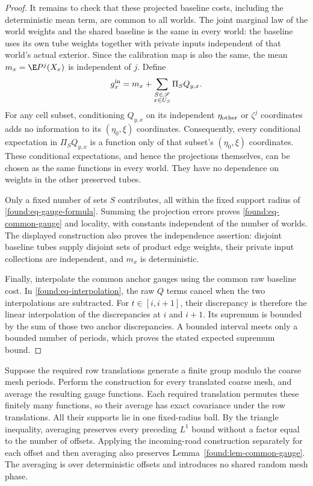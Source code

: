 \begin{proof}
It remains to check that these projected baseline costs, including
the deterministic mean term, are common to all worlds.  The joint
marginal law of the world weights and the shared baseline is the same
in every world: the baseline uses its own tube weights together with
private inputs independent of that world's actual exterior.  Since
the calibration map is also the same, the mean
$m_x=\E P^j(X_x)$ is independent of $j$.  Define
\[
 g_x^{\rm in}=m_x+
       \sum_{\substack{S\in\mathscr S\\x\in U_S}}
                        \Pi_SQ_{y,x}.
\]
For any cell subset, conditioning $Q_{y,x}$ on its independent
$\eta_{\rm other}$ or $\zeta^j$ coordinates adds no information to
its $(\eta_0,\xi)$ coordinates.  Consequently, every conditional
expectation in $\Pi_SQ_{y,x}$ is a function only of that subset's
$(\eta_0,\xi)$ coordinates.  These conditional expectations, and
hence the projections themselves, can be chosen as the same
functions in every world.  They have no dependence on weights in
the other preserved tubes.

Only a fixed number of sets $S$ contributes, all within the fixed
support radius of \eqref{found:eq-gauge-formula}.  Summing the
projection errors proves \eqref{found:eq-common-gauge} and locality,
with constants independent of the number of worlds.  The displayed
construction also proves the independence assertion: disjoint
baseline tubes supply disjoint sets of product edge weights, their
private input collections are independent, and $m_x$ is deterministic.

Finally, interpolate the common anchor gauges using the common raw
baseline cost.  In \eqref{found:eq-interpolation}, the raw $Q$ terms
cancel when the two interpolations are subtracted.  For
$t\in[i,i+1]$, their discrepancy is therefore the linear
interpolation of the discrepancies at $i$ and $i+1$.  Its supremum
is bounded by the sum of those two anchor discrepancies.  A bounded
interval meets only a bounded number of periods, which proves the
stated expected supremum bound.
\end{proof}

\begin{remark}
\label{found:rem-offsets}
Suppose the required row translations generate a finite group modulo
the coarse mesh periods.  Perform the construction for every
translated coarse mesh, and average the resulting gauge functions.
Each required translation permutes these finitely many functions,
so their average has exact covariance under the row translations.
All their supports lie in one fixed-radius ball.  By the triangle
inequality, averaging preserves every preceding $L^1$ bound without
a factor equal to the number of offsets.  Applying the incoming-road
construction separately for each offset and then averaging also
preserves Lemma~\ref{found:lem-common-gauge}.  The averaging is over
deterministic offsets and introduces no shared random mesh phase.
\end{remark}

